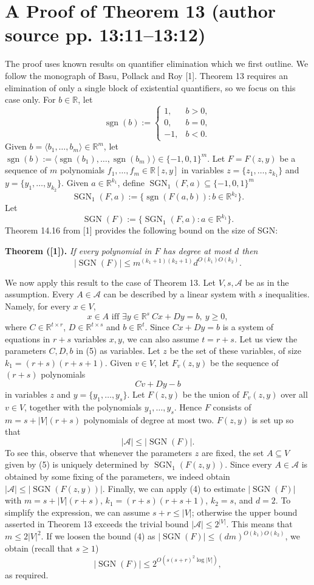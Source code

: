 \documentclass[10pt,a4paper]{article}
\newcommand{\SGN}{\operatorname{SGN}}
\newcommand{\sgn}{\operatorname{sgn}}
\newcommand{\RR}{\mathbb R}
\newenvironment{originalresult}[1]{\par\medskip\noindent\textbf{#1.}\itshape}{\par\medskip}
\begin{document}
\section*{A Proof of Theorem 13 (author source pp. 13:11--13:12)}
The proof uses known results on quantifier elimination which we first outline. We follow the monograph of Basu, Pollack and Roy [1]. Theorem 13 requires an elimination of only a single block of existential quantifiers, so we focus on this case only.
For $b\in\RR$, let
\[\sgn(b):=\begin{cases}1,&b>0,\\0,&b=0,\\-1,&b<0.\end{cases}\]
Given $b=\langle b_1,\ldots,b_m\rangle\in\RR^m$, let $\sgn(b):=\langle\sgn(b_1),\ldots,\sgn(b_m)\rangle\in\{-1,0,1\}^m$. Let $F=F(z,y)$ be a sequence of $m$ polynomials $f_1,\ldots,f_m\in\RR[z,y]$ in variables $z=\{z_1,\ldots,z_{k_1}\}$ and $y=\{y_1,\ldots,y_{k_2}\}$. Given $a\in\RR^{k_1}$, define $\SGN_1(F,a)\subseteq\{-1,0,1\}^m$
\[\SGN_1(F,a):=\{\sgn(F(a,b)):b\in\RR^{k_2}\}.\]
Let
\[\SGN(F):=\{\SGN_1(F,a):a\in\RR^{k_1}\}.\]
Theorem 14.16 from [1] provides the following bound on the size of SGN:
\begin{originalresult}{Theorem ([1])}
If every polynomial in $F$ has degree at most $d$ then
\[|\SGN(F)|\le m^{(k_1+1)(k_2+1)}d^{O(k_1)O(k_2)}.\tag{4}\]
\end{originalresult}
We now apply this result to the case of Theorem 13. Let $V,s,\mathcal A$ be as in the assumption. Every $A\in\mathcal A$ can be described by a linear system with $s$ inequalities. Namely, for every $x\in V$,
\[x\in A\text{ iff }\exists y\in\RR^s\ Cx+Dy=b,\ y\ge0,\tag{5}\]
where $C\in\RR^{t\times r}$, $D\in\RR^{t\times s}$ and $b\in\RR^t$. Since $Cx+Dy=b$ is a system of equations in $r+s$ variables $x,y$, we can also assume $t=r+s$.
Let us view the parameters $C,D,b$ in (5) as variables. Let $z$ be the set of these variables, of size $k_1=(r+s)(r+s+1)$. Given $v\in V$, let $F_v(z,y)$ be the sequence of $(r+s)$ polynomials
\[Cv+Dy-b\]
in variables $z$ and $y=\{y_1,\ldots,y_s\}$. Let $F(z,y)$ be the union of $F_v(z,y)$ over all $v\in V$, together with the polynomials $y_1,\ldots,y_s$. Hence $F$ consists of $m=s+|V|(r+s)$ polynomials of degree at most two.
$F(z,y)$ is set up so that
\[|\mathcal A|\le|\SGN(F)|.\]
To see this, observe that whenever the parameters $z$ are fixed, the set $A\subseteq V$ given by (5) is uniquely determined by $\SGN_1(F(z,y))$. Since every $A\in\mathcal A$ is obtained by some fixing of the parameters, we indeed obtain $|\mathcal A|\le|\SGN(F(z,y))|$.
Finally, we can apply (4) to estimate $|\SGN(F)|$ with $m=s+|V|(r+s)$, $k_1=(r+s)(r+s+1)$, $k_2=s$, and $d=2$. To simplify the expression, we can assume $s+r\le|V|$; otherwise the upper bound asserted in Theorem 13 exceeds the trivial bound $|\mathcal A|\le2^{|V|}$. This means that $m\le2|V|^2$. If we loosen the bound (4) as $|\SGN(F)|\le(dm)^{O(k_1)O(k_2)}$, we obtain (recall that $s\ge1$)
\[|\SGN(F)|\le2^{O(s(s+r)^2\log|V|)},\]
as required.
\end{document}
